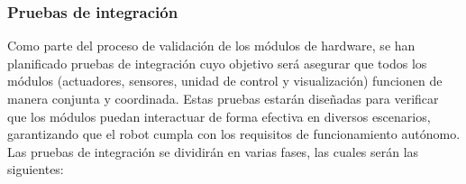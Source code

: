     \subsubsection{Pruebas de integraci\'on} %
    \label{ssub:pruebas}
    Como parte del proceso de validaci\'on de los m\'odulos de hardware, se han planificado
        pruebas de integraci\'on cuyo objetivo ser\'a asegurar que todos los m\'odulos (actuadores,
        sensores, unidad de control y visualizaci\'on) funcionen de manera conjunta y
        coordinada. Estas pruebas estar\'an dise\~nadas para verificar que los m\'odulos puedan
        interactuar de forma efectiva en diversos escenarios, garantizando que el robot cumpla
        con los requisitos de funcionamiento aut\'onomo.
    \vskip 0.5cm
    Las pruebas de integraci\'on se dividir\'an en varias fases, las cuales ser\'an las siguientes:
